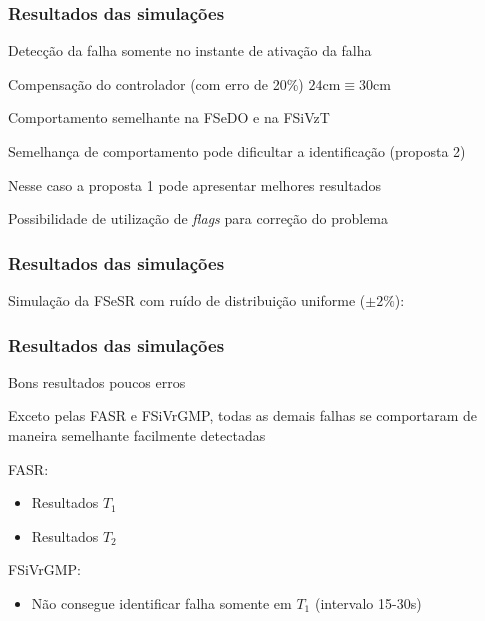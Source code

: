 \documentclass{beamer}
\begin{document}
\begin{frame}
    \frametitle{Resultados das simulações}

    Detecção da falha somente no instante de ativação da falha

    \vspace{0.25cm}

    Compensação do controlador (com erro de 20\%) \implica $24 \text{cm} \equiv
    30 \text{cm}$

    \vspace{0.25cm}

    Comportamento semelhante na FSeDO e na FSiVzT

    \vspace{0.25cm}

    Semelhança de comportamento pode dificultar a identificação (proposta 2)

    \vspace{0.25cm}

    Nesse caso a proposta 1 pode apresentar melhores resultados

    \vspace{0.25cm}

    Possibilidade de utilização de {\it flags} para correção do problema

\end{frame}

\begin{frame}
    \frametitle{Resultados das simulações}

\footnotesize Simulação da FSeSR com ruído de distribuição uniforme ($\pm 2\%$):

\begin{figure}[htb]
\footnotesize
\centering
\scalebox{0.68}{}
\end{figure}
    
\end{frame}

\begin{frame}
    \frametitle{Resultados das simulações}

    Bons resultados \implica poucos erros

    \vspace{0.25cm}

    Exceto pelas FASR e FSiVrGMP, todas as demais falhas se comportaram de
    maneira semelhante \implica facilmente detectadas

    \vspace{0.25cm}

    FASR:

\begin{itemize}
    \item Resultados $T_1$ \alert{\Checkmark}
    \item Resultados $T_2$ \alert{\XSolidBrush}
\end{itemize}

    FSiVrGMP:

\begin{itemize}
    \item Não consegue identificar falha somente em $T_1$ (intervalo 15-30s)
\end{itemize}

\end{frame}
\end{document}
